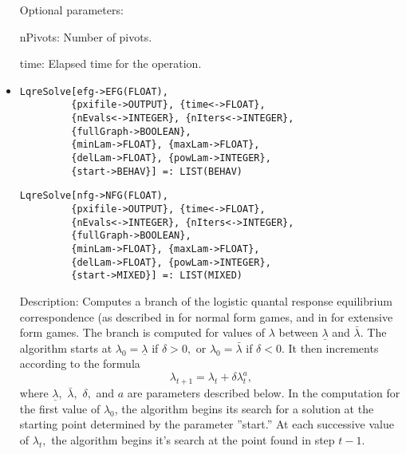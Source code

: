\begin{itemize}
\item
[Optional parameters:]\hfil\null

\bd
\item[nPivots:] Number of pivots. 
\item[time:] Elapsed time for the operation.
\ed
\ed

\item
\protect \large \begin{verbatim}
LqreSolve[efg->EFG(FLOAT),
         {pxifile->OUTPUT}, {time<->FLOAT},
         {nEvals<->INTEGER}, {nIters<->INTEGER},
         {fullGraph->BOOLEAN},
         {minLam->FLOAT}, {maxLam->FLOAT}, 
         {delLam->FLOAT}, {powLam->INTEGER}, 
         {start->BEHAV}] =: LIST(BEHAV)
\end{verbatim}\normalsize

\protect \large \begin{verbatim}
LqreSolve[nfg->NFG(FLOAT),
         {pxifile->OUTPUT}, {time<->FLOAT},
         {nEvals<->INTEGER}, {nIters<->INTEGER},
         {fullGraph->BOOLEAN},
         {minLam->FLOAT}, {maxLam->FLOAT}, 
         {delLam->FLOAT}, {powLam->INTEGER}, 
         {start->MIXED}] =: LIST(MIXED)
\end{verbatim}\normalsize

\bd
\item
[Description:] Computes a branch of the logistic quantal response
equilibrium correspondence (as described in \cite[1995]{McKPal:95a}
for normal form games, and in \cite[1995b]{McKPal:95b} for extensive
form games.  The branch is computed for values of $\lambda$ between
$\underline{\lambda}$ and $\bar{\lambda}.$ The algorithm starts at
$\lambda_0 = \underline{\lambda}$ if $\delta>0,$ or $\lambda_0 =
\bar{\lambda}$ if $\delta<0$. It then increments according to the
formula 
$$
\lambda_{t+1} = \lambda_t +\delta \lambda_t^a,
$$ where $\underline\lambda,$ $\bar\lambda,$ $\delta,$ and $a$ are
parameters described below. In the computation for the first value of
$\lambda_0$, the algorithm begins its search for a solution at the
starting point determined by the parameter ''start.''  At each
successive value of $\lambda_t,$ the algorithm begins it's search at
the point found in step $t - 1.$ 


\end{itemize}
